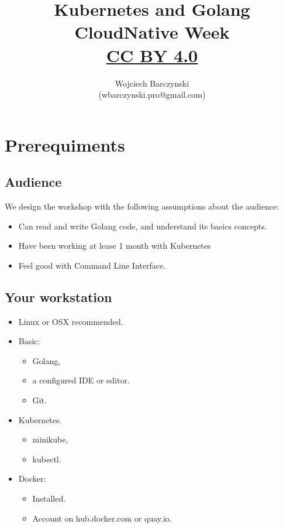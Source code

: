 \documentclass[11pt, letterpaper]{article}
\title{Kubernetes and Golang\\CloudNative Week\\{ \small \href{https://creativecommons.org/licenses/by/4.0/}{CC BY 4.0} }  }
\author{Wojciech Barczynski\\(wbarczynski.pro@gmail.com)}
\date{}
\begin{document}

\begin{titlepage}
\maketitle
\end{titlepage}

\tableofcontents
\pagebreak
\section{Prerequiments}

\subsection{Audience}

We design the workshop with the following assumptions about the audience:

\begin{itemize}%
\item Can read and write Golang code, and understand its basics concepts.%
\item Have been working at lease 1 month with Kubernetes%
\item Feel good with Command Line Interface.%
\end{itemize}%

\subsection{Your workstation}

\begin{itemize}%
\item Linux or {\small OSX} recommended.%
\item Basic: \begin{itemize}%
    \item Golang,%
    \item a configured IDE or editor.%
    \item Git.
    \end{itemize}%
\item Kubernetes.%
\begin{itemize}%
    \item minikube,%
    \item kubectl.%
\end{itemize}
\item Docker: \begin{itemize}%
    \item Installed.%
    \item Account on hub.docker.com or quay.io.%
    \end{itemize}
\end{itemize}
\end{document}
